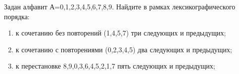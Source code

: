 \question 
Задан алфавит А={0,1,2,3,4,5,6,7,8,9}. Найдите в рамках лексикографического порядка:
\begin{enumerate}
\item  к сочетанию без повторений (1,4,5,7) три следующих и предыдущих;
\item  к сочетанию с повторениями (0,2,3,4,5) два следующих и предыдущих;
\item  к перестановке 8,9,0,3,6,4,5,2,1,7 пять следующих и предыдущих;
\end{enumerate}
